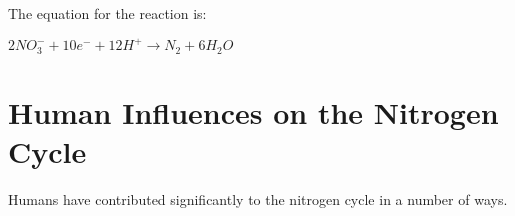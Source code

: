 The equation for the reaction is:
\begin{center}
\rm${2NO_{3}^{-} + 10e^{-} + 12H^{+} \rightarrow N_{2} + 6H_{2}O}$
\end{center} 








\section{Human Influences on the Nitrogen Cycle}
\label{sec:global cycles:human influences}

Humans have contributed significantly to the nitrogen cycle in a number of ways. 


